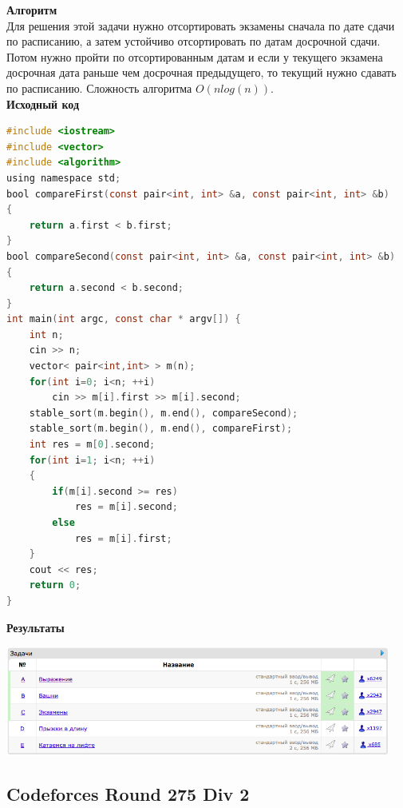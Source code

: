 \documentclass[a4paper,12pt]{article}
\begin{document}
\textbf{{\large Алгоритм}} \\
Для решения этой задачи нужно отсортировать экзамены сначала по дате сдачи по расписанию, а затем устойчиво отсортировать по датам досрочной сдачи. Потом нужно пройти по отсортированным датам и если у текущего экзамена досрочная дата раньше чем досрочная предыдущего, то текущий нужно сдавать по расписанию. Сложность алгоритма $O(nlog(n))$.\\

\textbf{{\large Исходный код}}
\begin{lstlisting}[language=C]
#include <iostream>
#include <vector>
#include <algorithm>
using namespace std;
bool compareFirst(const pair<int, int> &a, const pair<int, int> &b)
{
    return a.first < b.first;
}
bool compareSecond(const pair<int, int> &a, const pair<int, int> &b)
{
    return a.second < b.second;
}
int main(int argc, const char * argv[]) {
    int n;
    cin >> n;
    vector< pair<int,int> > m(n);
    for(int i=0; i<n; ++i)
        cin >> m[i].first >> m[i].second;
    stable_sort(m.begin(), m.end(), compareSecond);
    stable_sort(m.begin(), m.end(), compareFirst);
    int res = m[0].second;
    for(int i=1; i<n; ++i)
    {
        if(m[i].second >= res)
            res = m[i].second;
        else
            res = m[i].first;
    }
    cout << res;
    return 0;
}
\end{lstlisting}

\textbf{{\large Результаты}} \\
\begin{center}
\includegraphics[width=0.95\textwidth]{C_274/A_C_274_result.png}\\ [1cm]
\end{center}



%
%

\newpage
\subsection{Codeforces Round 275 Div 2}
\end{document}

